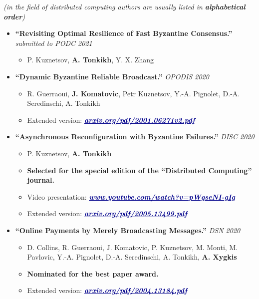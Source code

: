 \documentclass[10pt,a4paper]{extarticle}
\def\lnk#1#2{\href{#1}{\textcolor{darkblue}{\tbf{\textit{\underline{#2}}}}}}
\def\tbf{\textbf}
\def\lrg#1{\large\textbf{#1}\normalsize}
\def\headline#1{\vspace{0pt}\bigskip\hbox to \hsize{\hrulefill\quad\lower.3em\hbox{\lrg{\textsc{#1}}}\quad\hrulefill}\bigskip\vspace{-2pt}}
\newenvironment{reslist}
  {\vspace{-6pt}
  \begin{itemize}[label={\textcolor{blue}{$\mathbf{\diamond}$}},leftmargin=12pt]}
  {\end{itemize}
  \vspace{-0pt}}
\newcommand{\resRaw}[1]{
  \vspace{2pt}
  \item #1\normalsize
  \vspace{-4pt}
}
\newenvironment{publication}[3]
  {\resRaw{\textbf{``#2.''} \textit{#3}}
  \beginres
  \subres {#1}}
  {\endres}
\def\res#1{\resRaw {\tbf{#1}}}
\def\beginres{\begin{itemize}[label=\raisebox{0.5ex}{\tiny$\bullet$}]}
\def\endres{\end{itemize}\vspace{-6pt}}
\def\subres{\vspace{0pt}\item}
\begin{document}
\vspace{-3pt}
\noindent\textit{(in the field of distributed computing authors are usually listed in \textbf{alphabetical order})}
\vspace{5pt}

\begin{reslist}
  \begin{publication}
  {P. Kuznetsov, \textbf{A. Tonkikh}, Y. X. Zhang}
  {Revisiting Optimal Resilience of Fast Byzantine Consensus}
  {submitted to PODC 2021}
  \end{publication}

  \begin{publication}
  {R. Guerraoui, \textbf{J. Komatovic}, Petr Kuznetsov, Y.-A. Pignolet, D.-A. Seredinschi, A. Tonkikh}
  {Dynamic Byzantine Reliable Broadcast}
  {OPODIS 2020}
    \subres Extended version: \lnk{https://arxiv.org/pdf/2001.06271v2.pdf}{arxiv.org/pdf/2001.06271v2.pdf}
  \end{publication}

  \begin{publication}
  {P. Kuznetsov, \textbf{A. Tonkikh}}
  {Asynchronous Reconfiguration with Byzantine Failures}
  {DISC 2020}
    \subres \textbf{Selected for the special edition of the ``Distributed Computing'' journal.}
    \subres Video presentation: \lnk{https://www.youtube.com/watch?v=pWgseNI-gIg}{www.youtube.com/watch?v=pWgseNI-gIg}
    \subres Extended version: \lnk{https://arxiv.org/pdf/2005.13499.pdf}{arxiv.org/pdf/2005.13499.pdf}
  \end{publication}

  \begin{publication}
  {D. Collins, R. Guerraoui, J. Komatovic, P. Kuznetsov, M. Monti, M. Pavlovic, Y.-A. Pignolet, D.-A. Seredinschi, A. Tonkikh, \textbf{A. Xygkis}}
  {Online Payments by Merely Broadcasting Messages}
  {DSN 2020}
    \subres \textbf{Nominated for the best paper award.}
    \subres Extended version: \lnk{https://arxiv.org/pdf/2004.13184.pdf}{arxiv.org/pdf/2004.13184.pdf}
  \end{publication}
\end{reslist}


\end{document}

